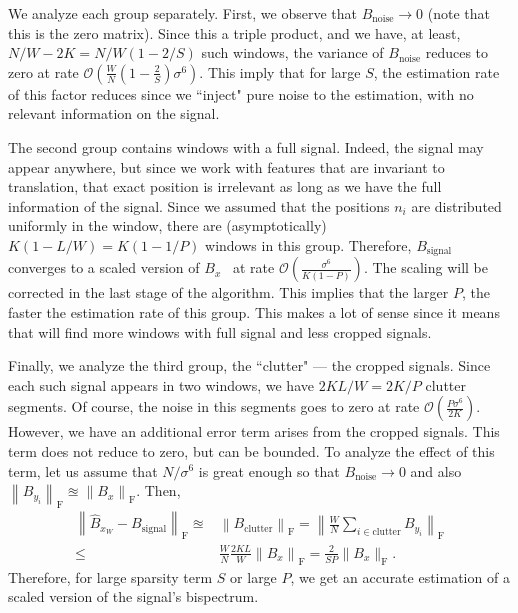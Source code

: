 \documentclass[journal]{IEEEtran}
\numberwithin{equation}{section}
\numberwithin{figure}{section}
\theoremstyle{plain}
\theoremstyle{definition}
\theoremstyle{remark}
\theoremstyle{plain}
\theoremstyle{remark}
\theoremstyle{plain}
\theoremstyle{plain}
\newcommand{\order}[1]{\mathcal{O}\left({#1} \right)}
\begin{document}
We analyze each group separately. First, we observe that $B_\textrm{noise}\to 0$ (note that this is the zero matrix). Since this a triple product, and we have, at least, $N/W-2K =N/W(1-2/S) $ such windows, the variance of $B_\textrm{noise}$ reduces to zero at rate  $\order{\frac{W}{N}\left(1-\frac{2}{S}\right)\sigma^6}$. This imply that for large $S$, the estimation rate of this factor reduces since we ``inject" pure noise to the estimation, with no relevant information on the signal.

The second group contains windows with a full signal. Indeed, the signal may appear anywhere, but since we work with features that are invariant to translation, that exact position is irrelevant as long as we have the full information of the signal. Since we assumed that the positions  $n_i$ are distributed uniformly in the window, there are (asymptotically) $K(1-L/W) = K(1-1/P)$ windows in this group. 
Therefore, $B_\textrm{signal}$ converges to a scaled version of $B_x$  \ at rate $\order{\frac{\sigma^6}{K(1-P)}}$. The scaling will be corrected in the last stage of the algorithm. This implies that the larger $P$, the faster the estimation rate of this group. This makes a lot of sense since it means that will find more windows with full signal and less cropped signals.

Finally, we analyze the third group, the  ``clutter" --- the cropped signals. Since each such signal appears in two windows,
we have $2KL/W = 2K/P$ clutter segments. Of course, the noise in this segments goes to zero
at rate $\order{\frac{P\sigma^6}{2K}}$. However, we have an additional error term arises from  the cropped signals. This term does not reduce to zero, but can be bounded. 
 To analyze the effect of this term, let us assume that $N/\sigma^6$ is great enough so that $B_\textrm{noise}\to 0$ and also $\left\|B_{y_i}\right\|_{\textrm{F}} \approxeq \left\|B_x\right\|_{\textrm{F}}$. Then,
\begin{equation}
\begin{split}
\left\| \hat{B}_{x_W} - B_\textrm{signal}\right\|_{\textrm{F}} \approxeq&  \left\|B_\textrm{clutter}\right\|_{\textrm{F}}
= \left\|\frac{W}{N}\sum_{i\in\textrm{clutter}}B_{y_i}\right\|_{\textrm{F}}
\\ \leq & 
\frac{W}{N}\frac{2KL}{W}\left\|B_x\right\|_{\textrm{F}} = \frac{2}{SP}
\|B_x\|_{\textrm{F}}.
\end{split}
\end{equation}
Therefore, for large sparsity term $S$ or large $P$, we get an accurate estimation of a scaled version of the signal's bispectrum. 
\end{document}
